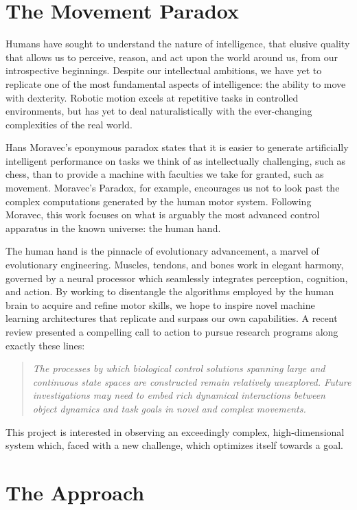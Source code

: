 \documentclass[../main.tex]{subfiles}
\begin{document}
\section{The Movement Paradox}

Humans have sought to understand the nature of intelligence, that elusive quality that allows us to perceive, reason, and act upon the world around us, from our introspective beginnings. Despite our intellectual ambitions, we have yet to replicate one of the most fundamental aspects of intelligence: the ability to move with dexterity. Robotic motion excels at repetitive tasks in controlled environments, but has yet to deal naturalistically with the ever-changing complexities of the real world. 

Hans Moravec's eponymous paradox states that it is easier to generate artificially intelligent performance on tasks we think of as intellectually challenging, such as chess, than to provide a machine with faculties we take for granted, such as movement. Moravec's Paradox, for example, encourages us not to look past the complex computations generated by the human motor system. Following Moravec, this work focuses on what is arguably the most advanced control apparatus in the known universe: the human hand. 

The human hand is the pinnacle of evolutionary advancement, a marvel of evolutionary engineering. Muscles, tendons, and bones work in elegant harmony, governed by a neural processor which seamlessly integrates perception, cognition, and action. By working to disentangle the algorithms employed by the human brain to acquire and refine motor skills, we hope to inspire novel machine learning architectures that replicate and surpass our own capabilities. A recent review presented a compelling call to action to pursue research programs along exactly these lines:
%
\begin{quote}
  \textit{The processes by which biological control solutions spanning large and continuous state spaces are constructed remain relatively unexplored. Future investigations may need to embed rich dynamical interactions between object dynamics and task goals in novel and complex movements\cite{McNamee2019}.}
\end{quote}
%
This project is interested in observing an exceedingly complex, high-dimensional system which, faced with a new challenge, which optimizes itself towards a goal.






\section{The Approach}
\end{document}
